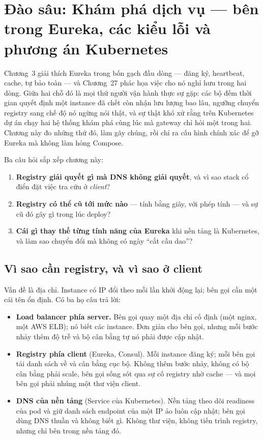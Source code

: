 \chapter{Đào sâu: Khám phá dịch vụ --- bên trong Eureka, các kiểu lỗi và phương án Kubernetes}
\label{ch:dd-discovery}

Chương~3 giải thích Eureka trong bốn gạch đầu dòng --- đăng ký,
heartbeat, cache, tự bảo toàn --- và Chương~27 phác họa việc cho nó nghỉ
hưu trong hai dòng. Giữa hai chỗ đó là mọi thứ người vận hành thực sự
gặp: các bộ đếm thời gian quyết định một instance đã chết còn nhận lưu
lượng bao lâu, ngưỡng chuyển registry sang chế độ nó ngừng nói thật, và
sự thật khó xử rằng trên Kubernetes dự án chạy hai hệ thống khám phá
cùng lúc mà gateway chỉ hỏi một trong hai. Chương này đo những thứ đó,
làm gãy chúng, rồi chỉ ra cấu hình chính xác để gỡ Eureka mà không làm
hỏng Compose.

Ba câu hỏi sắp xếp chương này:

\begin{enumerate}
  \item \textbf{Registry giải quyết gì mà DNS không giải quyết}, và vì
  sao stack cổ điển đặt việc tra cứu ở \emph{client}?
  \item \textbf{Registry có thể cũ tới mức nào} --- tính bằng giây, với
  phép tính --- và sự cũ đó gây gì trong lúc deploy?
  \item \textbf{Cái gì thay thế từng tính năng của Eureka} khi nền tảng
  là Kubernetes, và làm sao chuyển đổi mà không có ngày ``cắt cầu dao''?
\end{enumerate}

\section{Vì sao cần registry, và vì sao ở client}

Vấn đề là địa chỉ. Instance có IP đổi theo mỗi lần khởi động lại; bên
gọi cần một cái tên ổn định. Có ba họ câu trả lời:

\begin{itemize}
  \item \textbf{Load balancer phía server.} Bên gọi quay một địa chỉ cố
  định (một nginx, một AWS ELB); nó biết các instance. Đơn giản cho bên
  gọi, nhưng mỗi bước nhảy thêm độ trễ và bộ cân bằng tự nó phải được
  cập nhật.
  \item \textbf{Registry phía client} (Eureka, Consul). Mỗi instance
  đăng ký; mỗi bên gọi tải danh sách về và cân bằng cục bộ. Không thêm
  bước nhảy, không có bộ cân bằng phải scale, bên gọi sống sót qua sự
  cố registry nhờ cache --- và mọi bên gọi phải nhúng một thư viện
  client.
  \item \textbf{DNS của nền tảng} (Service của Kubernetes). Nền tảng
  theo dõi readiness của pod và giữ danh sách endpoint của một IP ảo
  luôn cập nhật; bên gọi dùng DNS thuần và không biết gì. Không thư
  viện, không tiến trình registry, nhưng chỉ bên trong nền tảng đó.
\end{itemize}

